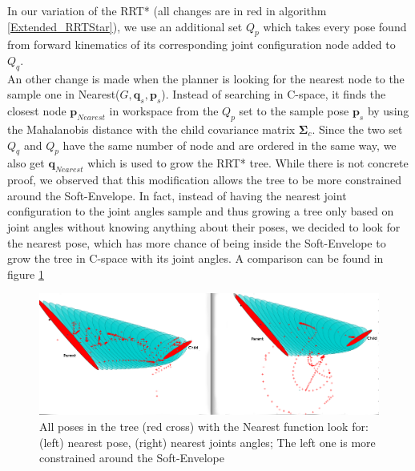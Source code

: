 \documentclass[letterpaper, 10 pt, conference]{ieeeconf}  %
\newcommand{\mb}[1]{{\boldsymbol{#1}}}
\begin{document}
 
In our variation of the RRT* (all changes are in red in algorithm \ref{Extended_RRTStar}), we use an additional set $Q_p$ which takes every pose found from forward kinematics of its corresponding joint configuration node added to $Q_q$. \\
An other change is made when the planner is looking for the nearest node to the sample one in {\selectfont Nearest($G,\mb{q}_s,\mb{p}_s$)}. Instead of searching in C-space, it finds the closest node  $\mb{p}_{Nearest}$  in workspace from the $Q_p$ set to the sample pose $\mb{p}_s$ by using the Mahalanobis distance with the child covariance matrix $\mb{\Sigma}_c$. Since the two set $Q_q$ and $Q_p$ have the same number of node and are ordered in the same way, we also get $\mb{q}_{Nearest}$ which is used to grow the RRT* tree. While there is not concrete proof, we observed that this modification allows the tree to be more constrained around the Soft-Envelope. In fact, instead of having the nearest joint configuration to the  joint angles sample and thus growing a tree only based on joint angles without knowing anything about their poses, we decided to look for the nearest pose, which has more chance of being inside the Soft-Envelope  to grow the tree in C-space with its joint angles. A comparison can be found in figure \ref{Nearest} \\

\begin{figure}[h]
	\centering
	\includegraphics[scale=0.16]{figure/WithVsWithoutNearestChange.png}
	\caption{All poses in the tree (red cross) with the Nearest function look for: (left) nearest pose, (right) nearest joints angles; The left one is more constrained around the Soft-Envelope}
	\label{Nearest}
\end{figure}
\end{document}
